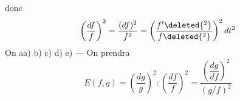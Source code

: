 donc
\[
\left(\frac{df}{f}\right)^2=\frac{(df)^2}{f^2}
=\left(\frac{f'\deleted{^{2}}}{f\deleted{^{2}}}\right)^2dt^2
\]
On a\quad a) b) c) d) e) --- On prendra
\[
E(f,g)=\left(\frac{dg}{g}\right)^2:
\left(\frac{df}{f}\right)^2
=\frac{\left(\dfrac{dg}{df}\right)^2}{(g/f)^2}
\]


